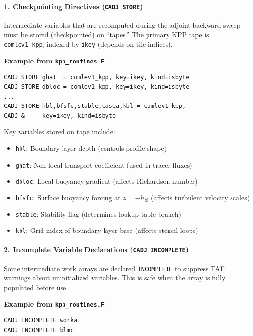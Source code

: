 \documentclass[12pt,letterpaper]{article}
\begin{document}
\paragraph{1. Checkpointing Directives (\texttt{CADJ STORE})}

Intermediate variables that are recomputed during the adjoint backward sweep
must be stored (checkpointed) on ``tapes.'' The primary KPP tape is
\texttt{comlev1\_kpp}, indexed by \texttt{ikey} (depends on tile indices).

\textbf{Example from \texttt{kpp\_routines.F}:}
\begin{lstlisting}[language=Fortran90KPP, caption={TAF checkpoint directives in \texttt{KPPMIX}.}]
CADJ STORE ghat  = comlev1_kpp, key=ikey, kind=isbyte
CADJ STORE dbloc = comlev1_kpp, key=ikey, kind=isbyte
...
CADJ STORE hbl,bfsfc,stable,casea,kbl = comlev1_kpp,
CADJ &     key=ikey, kind=isbyte
\end{lstlisting}

Key variables stored on tape include:
\begin{itemize}[leftmargin=*]
  \item \texttt{hbl}: Boundary layer depth (controls profile shape)
  \item \texttt{ghat}: Non-local transport coefficient (used in tracer fluxes)
  \item \texttt{dbloc}: Local buoyancy gradient (affects Richardson number)
  \item \texttt{bfsfc}: Surface buoyancy forcing at $z = -h_{\text{bl}}$ (affects
        turbulent velocity scales)
  \item \texttt{stable}: Stability flag (determines lookup table branch)
  \item \texttt{kbl}: Grid index of boundary layer base (affects stencil loops)
\end{itemize}

\paragraph{2. Incomplete Variable Declarations (\texttt{CADJ INCOMPLETE})}

Some intermediate work arrays are declared \texttt{INCOMPLETE} to suppress TAF
warnings about uninitialized variables. This is safe when the array is fully
populated before use.

\textbf{Example from \texttt{kpp\_routines.F}:}
\begin{lstlisting}[language=Fortran90KPP]
CADJ INCOMPLETE worka
CADJ INCOMPLETE blmc
\end{lstlisting}
\end{document}
